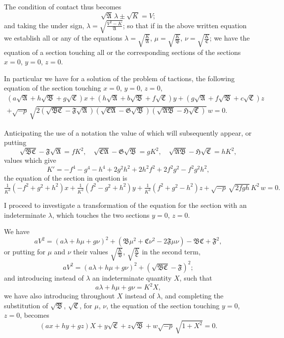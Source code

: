 \documentclass[11pt]{article}
\begin{document}
The condition of contact thus becomes
\[
\sqrt{\mathfrak{A}}\,\lambda \pm \sqrt{K} = V;
\]
and taking the under sign, $\lambda = \sqrt{\tfrac{V^2-K}{\mathfrak{A}}}$; so that if in the above written equation we establish all or any of the equations $\lambda=\sqrt{\tfrac{K}{\mathfrak{A}}}$, $\mu=\sqrt{\tfrac{K}{\mathfrak{B}}}$, $\nu=\sqrt{\tfrac{K}{\mathfrak{C}}}$; we have the equation of a section touching all or the corresponding sections of the sections $x=0$, $y=0$, $z=0$.

In particular we have for a solution of the problem of tactions, the following equation of the section touching $x=0$, $y=0$, $z=0$,
\begin{multline*}
(a\sqrt{\mathfrak{A}}+h\sqrt{\mathfrak{B}}+g\sqrt{\mathfrak{C}})x + (h\sqrt{\mathfrak{A}}+b\sqrt{\mathfrak{B}}+f\sqrt{\mathfrak{C}})y + (g\sqrt{\mathfrak{A}}+f\sqrt{\mathfrak{B}}+c\sqrt{\mathfrak{C}})z \\
+ \sqrt{-p}\,\sqrt{2(\sqrt{\mathfrak{B}\mathfrak{C}}-\mathfrak{F}\sqrt{\mathfrak{A}})(\sqrt{\mathfrak{C}\mathfrak{A}}-\mathfrak{G}\sqrt{\mathfrak{B}})(\sqrt{\mathfrak{A}\mathfrak{B}}-\mathfrak{H}\sqrt{\mathfrak{C}})}\,w = 0.
\end{multline*}

\newpage
\setcounter{page}{65}

Anticipating the use of a notation the value of which will subsequently appear, or putting
\[
\sqrt{\mathfrak{B}\mathfrak{C}}-\mathfrak{F}\sqrt{\mathfrak{A}} = fK^2, \quad \sqrt{\mathfrak{C}\mathfrak{A}}-\mathfrak{G}\sqrt{\mathfrak{B}} = gK^2, \quad \sqrt{\mathfrak{A}\mathfrak{B}}-\mathfrak{H}\sqrt{\mathfrak{C}} = hK^2,
\]
values which give
\[
K' = -f^4-g^4-h^4+2g^2h^2+2h^2f^2+2f^2g^2-f^2g^2h^2,
\]
the equation of the section in question is
\[
\tfrac{1}{K^2}(-f^2+g^2+h^2)x + \tfrac{1}{K^2}(f^2-g^2+h^2)y + \tfrac{1}{K^2}(f^2+g^2-h^2)z + \sqrt{-p}\,\sqrt{2fgh}\,K^2\,w = 0.
\]

I proceed to investigate a transformation of the equation for the section with an indeterminate $\lambda$, which touches the two sections $y=0$, $z=0$.

We have
\[
aV^2 = (a\lambda+h\mu+g\nu)^2 + (\mathfrak{B}\mu^2+\mathfrak{C}\nu^2-2\mathfrak{F}\mu\nu) - \mathfrak{B}\mathfrak{C} + \mathfrak{F}^2,
\]
or putting for $\mu$ and $\nu$ their values $\sqrt{\tfrac{K}{\mathfrak{B}}}$, $\sqrt{\tfrac{K}{\mathfrak{C}}}$ in the second term,
\[
aV^2 = (a\lambda+h\mu+g\nu)^2 + (\sqrt{\mathfrak{B}\mathfrak{C}}-\mathfrak{F})^2;
\]
and introducing instead of $\lambda$ an indeterminate quantity $X$, such that
\[
a\lambda+h\mu+g\nu = K^2 X,
\]
we have also introducing throughout $X$ instead of $\lambda$, and completing the substitution of $\sqrt{\mathfrak{B}}$, $\sqrt{\mathfrak{C}}$, for $\mu$, $\nu$, the equation of the section touching $y=0$, $z=0$, becomes
\[
(ax+hy+gz)X + y\sqrt{\mathfrak{C}} + z\sqrt{\mathfrak{B}} + w\sqrt{-p}\,\sqrt{1+X^2} = 0.
\]
\end{document}
